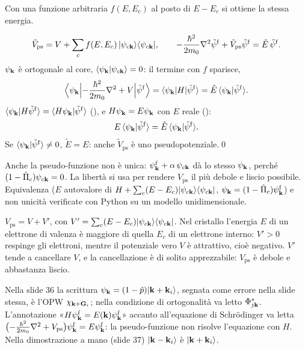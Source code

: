 \documentclass[11pt,a4paper]{article}
\begin{document}
Con una funzione arbitraria $f(E,E_c)$ al posto di $E-E_c$ si ottiene la stessa energia.
\begin{dimostrazione}[non unicità: $\tilde E=E$]
\[
\tilde V_{\mathrm{ps}}=V+\sum_cf(E,E_c)\,|\psi_{c\mathbf k}\rangle\langle\psi_{c\mathbf k}|,\qquad
-\frac{\hbar^2}{2m_0}\nabla^2\tilde\psi^{\mathrm f}+\tilde V_{\mathrm{ps}}\tilde\psi^{\mathrm f}=\tilde E\,\tilde\psi^{\mathrm f}.
\]
$\psi_{\mathbf k}$ è ortogonale al core, $\langle\psi_{\mathbf k}|\psi_{c\mathbf k}\rangle=0$: il termine con $f$ sparisce,
\[
\Bigl\langle\psi_{\mathbf k}\Bigl|-\frac{\hbar^2}{2m_0}\nabla^2+V\Bigr|\tilde\psi^{\mathrm f}\Bigr\rangle=\langle\psi_{\mathbf k}|H|\tilde\psi^{\mathrm f}\rangle
=\tilde E\,\langle\psi_{\mathbf k}|\tilde\psi^{\mathrm f}\rangle .
\]
$\langle\psi_{\mathbf k}|H\tilde\psi^{\mathrm f}\rangle=\langle H\psi_{\mathbf k}|\tilde\psi^{\mathrm f}\rangle$ (), e $H\psi_{\mathbf k}=E\psi_{\mathbf k}$ con $E$
reale ():
\[
E\,\langle\psi_{\mathbf k}|\tilde\psi^{\mathrm f}\rangle=\tilde E\,\langle\psi_{\mathbf k}|\tilde\psi^{\mathrm f}\rangle .
\]
Se $\langle\psi_{\mathbf k}|\tilde\psi^{\mathrm f}\rangle\ne0$, $\tilde E=E$: anche $\tilde V_{\mathrm{ps}}$ è uno pseudopotenziale.\qed
\end{dimostrazione}
Anche la pseudo-funzione non è unica: $\psi^{\mathrm f}_{\mathbf k}+\alpha\,\psi_{c\mathbf k}$ dà lo stesso $\psi_{\mathbf k}$, perché $(1-\hat\Pi_c)\psi_{c\mathbf k}=0$. La
libertà si usa per rendere $V_{\mathrm{ps}}$ il più debole e liscio possibile. Equivalenza ($E$ autovalore di $H+\sum_c(E-E_c)|\psi_{c\mathbf k}\rangle
\langle\psi_{c\mathbf k}|$, $\psi_{\mathbf k}=(1-\hat\Pi_c)\psi^{\mathrm f}_{\mathbf k}$) e non unicità verificate con Python su un modello unidimensionale.

$V_{\mathrm{ps}}=V+V'$, con $V'=\sum_c(E-E_c)|\psi_{c\mathbf k}\rangle\langle\psi_{c\mathbf k}|$. Nel cristallo l'energia $E$ di un elettrone di valenza è maggiore
di quella $E_c$ di un elettrone interno: $V'>0$ respinge gli elettroni, mentre il potenziale vero $V$ è attrattivo, cioè negativo. $V'$ tende a
cancellare $V$, e la cancellazione è di solito apprezzabile: $V_{\mathrm{ps}}$ è debole e abbastanza liscio.

\begin{osservazione}[slide 35--38]
Nella slide 36 la
scrittura $\psi_{\mathbf k}=(1-\hat p)|\mathbf k+\mathbf k_i\rangle$, segnata come errore nella slide stessa, è l'OPW $\chi_{\mathbf k+\mathbf G_i}$; nella condizione di ortogonalità
va letto $\Phi^*_{j\mathbf k}$. L'annotazione «$H\psi^{\mathrm f}_{\mathbf k}=E(\mathbf k)\psi^{\mathrm f}_{\mathbf k}$» accanto all'equazione di Schrödinger va letta
$\bigl(-\frac{\hbar^2}{2m_0}\nabla^2+V_{\mathrm{ps}}\bigr)\psi^{\mathrm f}_{\mathbf k}=E\psi^{\mathrm f}_{\mathbf k}$: la pseudo-funzione non risolve l'equazione
con $H$. Nella dimostrazione a mano (slide 37) $|\mathbf k-\mathbf k_i\rangle$ è $|\mathbf k+\mathbf k_i\rangle$.
\end{osservazione}
\end{document}
